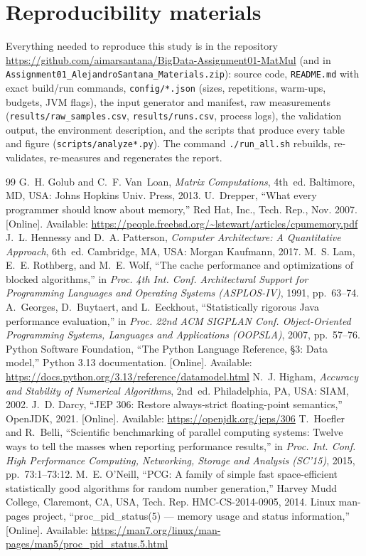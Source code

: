 \documentclass[10pt,a4paper]{article}
\newcommand{\repourl}{https://github.com/aimarsantana/BigData-Assignment01-MatMul}
\begin{document}
\section*{Reproducibility materials}
Everything needed to reproduce this study is in the repository \url{\repourl}
(and in \texttt{Assignment01\_AlejandroSantana\_Materials.zip}): source code, \texttt{README.md}
with exact build/run commands, \texttt{config/*.json} (sizes, repetitions, warm-ups, budgets,
JVM flags), the input generator and manifest, raw measurements (\texttt{results/raw\_samples.csv},
\texttt{results/runs.csv}, process logs), the validation output, the environment description,
and the scripts that produce every table and figure (\texttt{scripts/analyze*.py}). The command
\texttt{./run\_all.sh} rebuilds, re-validates, re-measures and regenerates the report.

\begin{thebibliography}{99}\small
{} G.~H. Golub and C.~F. Van~Loan, \emph{Matrix Computations}, 4th~ed.
Baltimore, MD, USA: Johns Hopkins Univ. Press, 2013.
 U.~Drepper, ``What every programmer should know about memory,''
Red Hat, Inc., Tech. Rep., Nov. 2007. [Online]. Available: \url{https://people.freebsd.org/~lstewart/articles/cpumemory.pdf}
 J.~L. Hennessy and D.~A. Patterson, \emph{Computer Architecture: A
Quantitative Approach}, 6th~ed. Cambridge, MA, USA: Morgan Kaufmann, 2017.
 M.~S. Lam, E.~E. Rothberg, and M.~E. Wolf, ``The cache performance and
optimizations of blocked algorithms,'' in \emph{Proc. 4th Int. Conf. Architectural Support for
Programming Languages and Operating Systems (ASPLOS-IV)}, 1991, pp.~63--74.
 A.~Georges, D.~Buytaert, and L.~Eeckhout, ``Statistically rigorous Java
performance evaluation,'' in \emph{Proc. 22nd ACM SIGPLAN Conf. Object-Oriented Programming
Systems, Languages and Applications (OOPSLA)}, 2007, pp.~57--76.
 Python Software Foundation, ``The Python Language Reference, \S3:
Data model,'' Python 3.13 documentation. [Online]. Available:
\url{https://docs.python.org/3.13/reference/datamodel.html}
 N.~J. Higham, \emph{Accuracy and Stability of Numerical Algorithms},
2nd~ed. Philadelphia, PA, USA: SIAM, 2002.
 J.~D. Darcy, ``JEP 306: Restore always-strict floating-point semantics,''
OpenJDK, 2021. [Online]. Available: \url{https://openjdk.org/jeps/306}
 T.~Hoefler and R.~Belli, ``Scientific benchmarking of parallel computing
systems: Twelve ways to tell the masses when reporting performance results,'' in \emph{Proc.
Int. Conf. High Performance Computing, Networking, Storage and Analysis (SC'15)}, 2015,
pp.~73:1--73:12.
 M.~E. O'Neill, ``PCG: A family of simple fast space-efficient
statistically good algorithms for random number generation,'' Harvey Mudd College, Claremont,
CA, USA, Tech. Rep. HMC-CS-2014-0905, 2014.
 Linux man-pages project, ``proc\_pid\_status(5) --- memory usage and status
information,'' [Online]. Available: \url{https://man7.org/linux/man-pages/man5/proc_pid_status.5.html}
\end{thebibliography}
\end{document}
